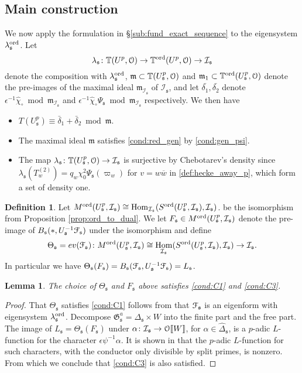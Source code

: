 \documentclass[leqno]{amsart}
\newtheorem{lem}[thm]{Lemma}
\theoremstyle{definition}
\newtheorem{defn}[thm]{Definition}
\theoremstyle{remark}
\newcommand{\eo}{\EuScript{O}}
\DeclareMathOperator{\Hom}{Hom}
\newcommand{\fm}{\mathfrak{m}}
\newcommand{\fs}{\mathfrak{s}}
\newcommand{\bw}{{\overline{w}}}
\newcommand{\fG}{\mathfrak{G}}
\newcommand{\TT}{\mathbb{T}} %
\newcommand{\euF}{\EuScript{F}} %
\newcommand{\I}{\mathcal{I}} %
\newcommand{\ord}{\textnormal{ord}} %
\begin{document}
\subsection{Main construction}

We now apply the formulation in \S\ref{sub:fund_exact_sequence}
to the eigensystem $\lambda^{\ord}_\fs$. Let
\[
    \lambda_\fs\colon \TT(U^p,\eo)\to\TT^{\ord}(U^p,\eo)\to\I_\fs
\]
denote the composition with $\lambda^{\ord}_\fs$,
$\fm\subset \TT(U^p_\fs,\eo)$ and
$\fm_1\subset \TT^\ord(U^p_\fs,\eo)$
denote the pre-images of the maximal ideal $\fm_{\I_\fs}$ of $\I_\fs$,
and let $\bar{\delta_1}, \bar{\delta_2}$
denote $\epsilon^{-1}\hat{\chi}_\circ\bmod \fm_{\I_\fs}$ 
and $\epsilon^{-1}\hat{\chi}_\circ\Psi_\fs\bmod \fm_{\I_\fs}$ 
respectively. We then have
\begin{itemize}
\item $T(U^p_\fs)\equiv\bar{\delta}_1+\bar{\delta}_2\bmod \fm$.
\item The maximal ideal $\fm$ satisfies \eqref{cond:red_gen}
by \eqref{cond:gen_psi}.
\item The map $\lambda_\fs\colon \TT(U^p_\fs,\eo)\to \I_\fs$
is surjective by Chebotarev's density
since $\lambda_\fs(T_w^{(2)})=q_w\chi_0^2\Psi_\fs(\varpi_w)$
for $v=w\bw$ in \eqref{def:hecke_away_p},
which form a set of density one.
\end{itemize}

\begin{defn}
Let $M^{\ord}(U^p_\fs,\I_\fs)\cong\Hom_{\I_\fs}
(S^{\ord}(U^p_\fs,\I_\fs),\I_\fs)$.
be the isomorphism from Proposition \ref{prop:ord_to_dual}.
We let $F_\fs\in M^{\ord}(U^p_\fs,\I_\fs)$
denote the pre-image of
$B_{\fs}(*,U_\fs^{-1}\euF_{\fs})$
under the isomorphism and define
\[
    \Theta_\fs=ev(\euF_\fs)\colon 
    M^{\ord}(U^p_\fs,\I_\fs)\cong\Hom_{\I_\fs}
    (S^{\ord}(U^p_\fs,\I_\fs),\I_\fs)\to\I_\fs.
\]
In particular we have $\Theta_\fs(F_\fs)=
B_\fs(\euF_\fs,U_\fs^{-1}\euF_\fs)=L_\fs$.
\end{defn}

\begin{lem}
The choice of $\Theta_\fs$ and $F_\fs$ above
satisfies \ref{cond:C1} and \ref{cond:C3}.
\end{lem}
\begin{proof}
That $\Theta_\fs$ satisfies \ref{cond:C1} 
follows from that $\euF_\fs$ is an eigenform
with eigensystem $\lambda_\fs^{\ord}$.
Decompose $\fG_\fs^a=\Delta_\fs\times W$
into the finite part and the free part.
The image of $L_\fs=\Theta_\fs(F_\fs)$
under $\alpha\colon \I_\fs\to \eo\llbracket W\rrbracket$,
for $\alpha\in\hat{\Delta}_\fs$,
is a $p$-adic $L$-function 
for the character $\epsilon\psi^{-1}\alpha$.
It is shown in \cite{Hida10}
that the $p$-adic $L$-function for such characters,
with the conductor only divisible by split primes,
is nonzero.
From which we conclude that \ref{cond:C3}
is also satisfied.
\end{proof}
\end{document}
